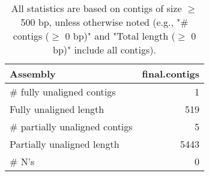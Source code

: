 \documentclass[12pt,a4paper]{article}
\begin{document}
\begin{table}[ht]
\begin{center}
\caption{All statistics are based on contigs of size $\geq$ 500 bp, unless otherwise noted (e.g., "\# contigs ($\geq$ 0 bp)" and "Total length ($\geq$ 0 bp)" include all contigs).}
\begin{tabular}{|l*{1}{|r}|}
\hline
Assembly & final.contigs \\ \hline
\# fully unaligned contigs & 1 \\ \hline
Fully unaligned length & 519 \\ \hline
\# partially unaligned contigs & 5 \\ \hline
Partially unaligned length & 5443 \\ \hline
\# N's & 0 \\ \hline
\end{tabular}
\end{center}
\end{table}
\end{document}
